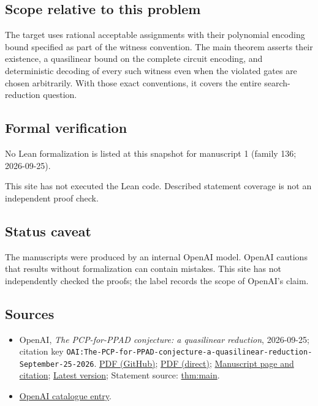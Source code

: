 \documentclass[11pt]{article}
\begin{document}
\subsection{Scope relative to this problem}
The target uses rational acceptable assignments with their polynomial encoding bound specified as part of the witness convention. The main theorem asserts their existence, a quasilinear bound on the complete circuit encoding, and deterministic decoding of every such witness even when the violated gates are chosen arbitrarily. With those exact conventions, it covers the entire search-reduction question.

\subsection{Formal verification}
No Lean formalization is listed at this snapshot for manuscript 1 (family 136; 2026-09-25).

This site has not executed the Lean code. Described statement coverage is not an independent proof check.

\subsection{Status caveat}
The manuscripts were produced by an internal OpenAI model. OpenAI cautions that results without formalization can contain mistakes. This site has not independently checked the proofs; the label records the scope of OpenAI's claim.

\subsection{Sources}
\begin{itemize}
\item OpenAI, \emph{The PCP-for-PPAD conjecture: a quasilinear reduction}, 2026-09-25; citation key \texttt{OAI:The-PCP-for-PPAD-conjecture-a-quasilinear-reduction-September-25-2026}. \href{https://github.com/openai/math/blob/adc7f1241b42e322a6451854ab7e4b4c146bf78a/preprints/The-PCP-for-PPAD-conjecture-a-quasilinear-reduction-September-25-2026/paper.pdf}{PDF (GitHub)}; \href{https://github.com/openai/math/raw/adc7f1241b42e322a6451854ab7e4b4c146bf78a/preprints/The-PCP-for-PPAD-conjecture-a-quasilinear-reduction-September-25-2026/paper.pdf}{PDF (direct)}; \href{https://github.com/openai/math/blob/adc7f1241b42e322a6451854ab7e4b4c146bf78a/preprints/The-PCP-for-PPAD-conjecture-a-quasilinear-reduction-September-25-2026/README.md}{Manuscript page and citation}; \href{https://github.com/openai/math/blob/main/preprints/The-PCP-for-PPAD-conjecture-a-quasilinear-reduction-September-25-2026/paper.pdf}{Latest version}; Statement source: \href{https://github.com/openai/math/blob/adc7f1241b42e322a6451854ab7e4b4c146bf78a/preprints/The-PCP-for-PPAD-conjecture-a-quasilinear-reduction-September-25-2026/build/sections/01-introduction.tex\#L147}{thm:main}.
\item \href{https://github.com/openai/math/blob/adc7f1241b42e322a6451854ab7e4b4c146bf78a/CONTENTS.md}{OpenAI catalogue entry}.
\end{itemize}
\end{document}
